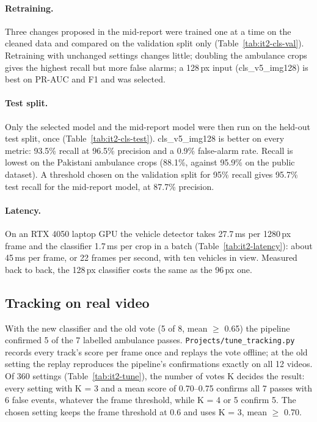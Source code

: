 \paragraph{Retraining.} Three changes proposed in the mid-report were trained one at a time on the cleaned data and
compared on the validation split only (Table~\ref{tab:it2-cls-val}). Retraining with unchanged settings changes
little; doubling the ambulance crops gives the highest recall but more false alarms; a 128\,px input
(cls\_v5\_img128) is best on PR-AUC and F1 and was selected.

\paragraph{Test split.} Only the selected model and the mid-report model were then run on the held-out test split,
once (Table~\ref{tab:it2-cls-test}). cls\_v5\_img128 is better on every metric: 93.5\% recall at 96.5\% precision
and a 0.9\% false-alarm rate. Recall is lowest on the Pakistani ambulance crops (88.1\%, against 95.9\% on the
public dataset). A threshold chosen on the validation split for 95\% recall gives 95.7\% test recall for the
mid-report model, at 87.7\% precision.

\paragraph{Latency.} On an RTX 4050 laptop GPU the vehicle detector takes 27.7\,ms per 1280\,px frame and the
classifier 1.7\,ms per crop in a batch (Table~\ref{tab:it2-latency}): about 45\,ms per frame, or 22 frames per
second, with ten vehicles in view. Measured back to back, the 128\,px classifier costs the same as the 96\,px one.

\subsection{Tracking on real video}
\label{sec:it2-tracking}
With the new classifier and the old vote (5 of 8, mean $\geq$ 0.65) the pipeline confirmed 5 of the 7 labelled
ambulance passes. \texttt{Projects/tune\_tracking.py} records every track's score per frame once and replays the
vote offline; at the old setting the replay reproduces the pipeline's confirmations exactly on all 12 videos.
Of 360 settings (Table~\ref{tab:it2-tune}), the number of votes K decides the result: every setting with K = 3
and a mean score of 0.70--0.75 confirms all 7 passes with 6 false events, whatever the frame threshold, while
K = 4 or 5 confirm 5. The chosen setting keeps the frame threshold at 0.6 and uses K = 3, mean $\geq$ 0.70.

